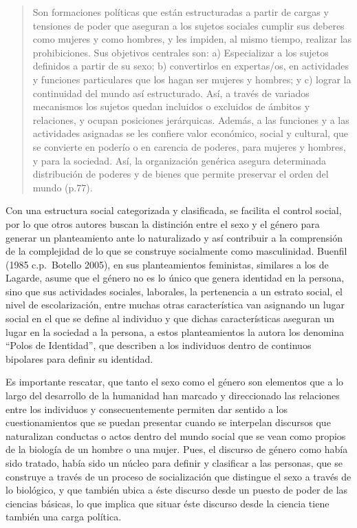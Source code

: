 \begin{quote}
    Son formaciones políticas que están estructuradas a partir de cargas y
    tensiones de poder que aseguran a los sujetos sociales cumplir sus deberes
    como mujeres y como hombres, y les impiden, al mismo tiempo, realizar
    las prohibiciones.
    Sus objetivos centrales son: a) Especializar a los sujetos definidos a partir de
    su sexo;
    b) convertirlos en expertas/os, en actividades y funciones particulares
    que los hagan ser mujeres y hombres;
    y c) lograr la continuidad del mundo así estructurado.
    Así, a través de variados mecanismos los sujetos quedan incluidos o excluidos de
    ámbitos y relaciones, y ocupan posiciones jerárquicas.
    Además, a las funciones y a las actividades asignadas se les confiere valor
    económico, social y cultural, que se convierte en poderío o en carencia de
    poderes, para mujeres y hombres, y para la sociedad.
    Así, la organización genérica asegura determinada distribución de poderes y de
    bienes que permite preservar el orden del mundo (p.77).
\end{quote}

Con una estructura social categorizada y clasificada, se facilita el control
social, por lo que otros autores buscan la distinción entre el sexo y el género
para generar un planteamiento ante lo naturalizado y así contribuir a la
comprensión de la complejidad de lo que se construye socialmente como
masculinidad.
Buenfil (1985 c.p.~Botello 2005), en sus planteamientos feministas, similares
a los de Lagarde, asume que el género no es lo único que genera identidad en la
persona, sino que sus actividades sociales, laborales, la pertenencia a un
estrato social, el nivel de escolarización, entre muchas otras característica
van asignando un lugar social en el que se define al individuo y que dichas
características aseguran un lugar en la sociedad a la persona, a estos
planteamientos la autora los denomina “Polos de Identidad”, que describen a los
individuos dentro de continuos bipolares para definir su identidad.

Es importante rescatar, que tanto el sexo como el género son elementos que a lo
largo del desarrollo de la humanidad han marcado y direccionado las relaciones
entre los individuos y consecuentemente permiten dar sentido a los
cuestionamientos que se puedan presentar cuando se interpelan discursos que
naturalizan conductas o actos dentro del mundo social que se vean como propios
de la biología de un hombre o una mujer.
Pues, el discurso de género como había sido tratado, había sido un núcleo para
definir y clasificar a las personas, que se construye a través de un proceso de
socialización que distingue el sexo a través de lo biológico, y que también
ubica a éste discurso desde un puesto de poder de las ciencias básicas, lo que
implica que situar éste discurso desde la ciencia tiene también una carga
política.

